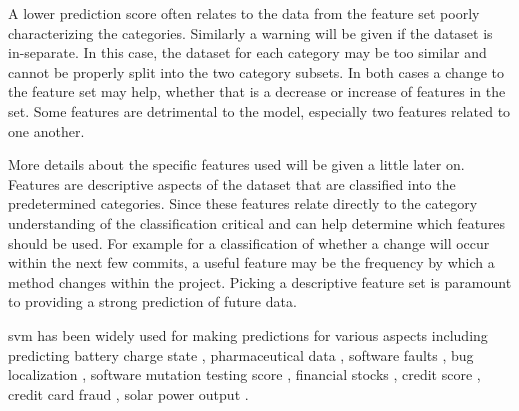 A lower prediction score often relates to the data from the feature set poorly characterizing the categories. Similarly a warning will be given if the dataset is in-separate. In this case, the dataset for each category may be too similar and cannot be properly split into the two category subsets. In both cases a change to the feature set may help, whether that is a decrease or increase of features in the set. Some features are detrimental to the model, especially two features related to one another. %

More details about the specific features used will be given a little later on. Features are descriptive aspects of the dataset that are classified into the predetermined categories. Since these features relate directly to the category understanding of the classification critical and can help determine which features should be used. For example for a classification of whether a change will occur within the next few commits, a useful feature may be the frequency by which a method changes within the project. Picking a descriptive feature set is paramount to providing a strong prediction of future data.


\gls{svm} has been widely used for making predictions for various aspects including predicting battery charge state \cite{Anton2013}, pharmaceutical data \cite{Burbidge2001}, software faults \cite{Gondra2008, Erturk2015, Malhotra2015, Kim2008, Moeyersoms2015, Neuhaus2007}, bug localization \cite{Murphy2007, Neuhaus2007}, software mutation testing score \cite{Jalbert2012}, financial stocks \cite{Kim2003}, credit score \cite{Huang2007}, credit card fraud \cite{Westland2011}, solar power output \cite{Zeng2016}.

